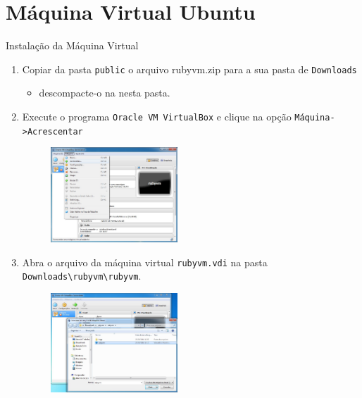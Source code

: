 \section{Máquina Virtual Ubuntu}
\begin{frame}{Instalação da Máquina Virtual}
  \begin{enumerate}
    \item Copiar da pasta \verb!public! o arquivo rubyvm.zip para a sua pasta de \verb!Downloads!  
    \begin{itemize}
     \item descompacte-o na nesta pasta.
    \end{itemize}
    
    \item Execute o programa \verb!Oracle VM VirtualBox! e clique na opção \verb!Máquina->Acrescentar!
    \begin{figure}[h!]
      \centering
      \includegraphics[width=0.45\textwidth]{devops/imagens/virtual-box-acrescentar-vm-1.jpg}
    \end{figure}
    
    \item Abra o arquivo da máquina virtual \verb!rubyvm.vdi! na pasta \verb|Downloads\rubyvm\rubyvm|.
    \begin{figure}[h!]
      \centering
      \includegraphics[width=0.45\textwidth]{devops/imagens/virtual-box-acrescentar-vm-2.jpg}
    \end{figure}


\end{enumerate}
\end{frame}
